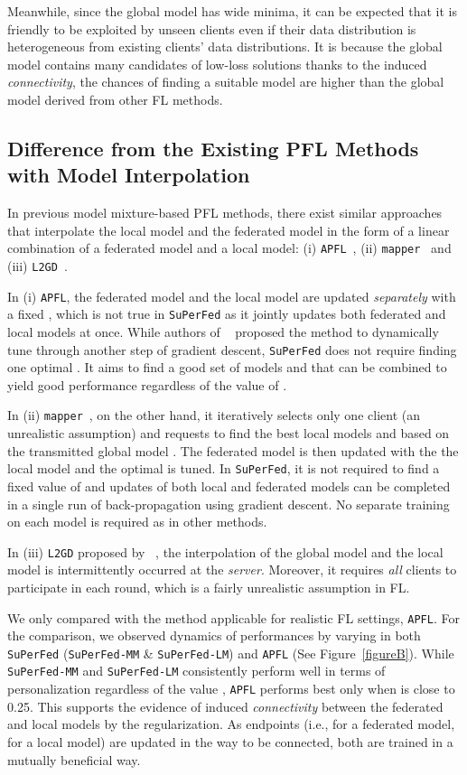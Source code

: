 \documentclass[sigconf]{acmart}
\begin{document}
Meanwhile, since the global model has wide minima, it can be expected that it is friendly to be exploited by unseen clients even if their data distribution is heterogeneous from existing clients' data distributions. It is because the global model contains many candidates of low-loss solutions thanks to the induced \textit{connectivity}, the chances of finding a suitable model are higher than the global model derived from other FL methods.  

\subsection{Difference from the Existing PFL Methods with Model Interpolation} In previous model mixture-based PFL methods, there exist similar approaches that interpolate the local model and the federated model in the form of a linear combination of a federated model and a local model: (i) \texttt{APFL}~\cite{apfl}, (ii) \texttt{mapper}~\cite{mansour+20} and (iii) \texttt{L2GD}~\cite{l2sgd}.

In (i) \texttt{APFL}, the federated model and the local model are updated \textit{separately} with a fixed , which is not true in \texttt{SuPerFed} as it jointly updates both federated and local models at once. While authors of ~\cite{apfl} proposed the method to dynamically tune  through another step of gradient descent, \texttt{SuPerFed} does not require finding one optimal . It aims to find a good set of models  and  that can be combined to yield good performance regardless of the value of .

In (ii) \texttt{mapper}~\cite{mansour+20}, on the other hand, it iteratively selects only one client (an unrealistic assumption) and requests to find the best local models  and  based on the transmitted global model . The federated model is then updated with the the local model and the optimal  is tuned. In \texttt{SuPerFed}, it is not required to find a fixed value of  and updates of both local and federated models can be completed in a single run of back-propagation using gradient descent. No separate training on each model is required as in other methods. 

In (iii) \texttt{L2GD} proposed by ~\cite{l2sgd}, the interpolation of the global model and the local model is intermittently occurred at the \textit{server}. Moreover, it requires \textit{all} clients to participate in each round, which is a fairly unrealistic assumption in FL.

We only compared with the method applicable for realistic FL settings, \texttt{APFL}. For the comparison, we observed dynamics of performances by varying  in both \texttt{SuPerFed} (\texttt{SuPerFed-MM} \& \texttt{SuPerFed-LM}) and \texttt{APFL} (See Figure~\ref{figureB}). While \texttt{SuPerFed-MM} and \texttt{SuPerFed-LM} consistently perform well in terms of personalization regardless of the value , \texttt{APFL} performs best only when  is close to 0.25. This supports the evidence of induced \textit{connectivity} between the federated and local models by the regularization. As endpoints (i.e.,  for a federated model,  for a local model) are updated in the way to be connected, both are trained in a mutually beneficial way.
\end{document}
